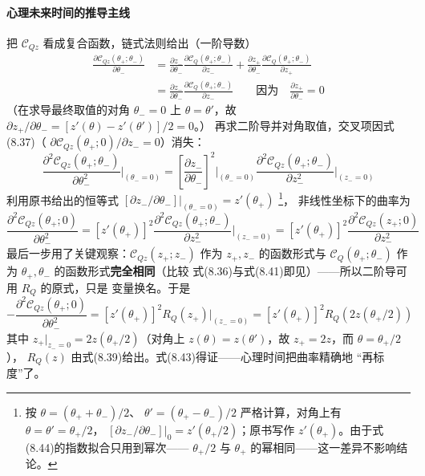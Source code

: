 \paragraph{心理未来时间的推导主线}
把 $\mathcal{C}_{Qz}$ 看成复合函数，链式法则给出（一阶导数）
\begin{align*}
\frac{\partial\mathcal{C}_{Qz}(\theta_{+};\theta_{-})}{\partial\theta_{-}}
&=\frac{\partial z_{-}}{\partial\theta_{-}}
\frac{\partial\mathcal{C}_{Q}(\theta_{+};\theta_{-})}{\partial z_{-}}
+\frac{\partial z_{+}}{\partial\theta_{-}}
\frac{\partial\mathcal{C}_{Q}(\theta_{+};\theta_{-})}{\partial z_{+}}\\
&=\frac{\partial z_{-}}{\partial\theta_{-}}
\frac{\partial\mathcal{C}_{Q}(\theta_{+};\theta_{-})}{\partial z_{-}}
\qquad\text{因为}\quad\frac{\partial z_{+}}{\partial\theta_{-}}=0
\tag{8.48}
\end{align*}
（在求导最终取值的对角 $\theta_{-}=0$ 上 $\theta=\theta'$，故
$\partial z_{+}/\partial\theta_{-}=[z'(\theta)-z'(\theta')]/2=0$。）
再求二阶导并对角取值，交叉项因式(8.37)（
$\partial\mathcal{C}_{Qz}(\theta_{+};0)/\partial z_{-}=0$）消失：
\begin{equation*}
\frac{\partial^{2}\mathcal{C}_{Qz}(\theta_{+};\theta_{-})}
{\partial\theta_{-}^{2}}\bigg|_{(\theta_{-}=0)}
=\left[\frac{\partial z_{-}}{\partial\theta_{-}}\right]^{2}
\bigg|_{(\theta_{-}=0)}
\frac{\partial^{2}\mathcal{C}_{Qz}(\theta_{+};\theta_{-})}
{\partial z_{-}^{2}}\bigg|_{(z_{-}=0)}
\end{equation*}
利用原书给出的恒等式
$[\partial z_{-}/\partial\theta_{-}]|_{(\theta_{-}=0)}=z'(\theta_{+})$
\footnote{按 $\theta=(\theta_{+}+\theta_{-})/2$、
$\theta'=(\theta_{+}-\theta_{-})/2$ 严格计算，对角上有
$\theta=\theta'=\theta_{+}/2$，
$[\partial z_{-}/\partial\theta_{-}]|_{0}=z'(\theta_{+}/2)$；原书写作
$z'(\theta_{+})$。由于式(8.44)的指数拟合只用到幂次——
$\theta_{+}/2$ 与 $\theta_{+}$ 的幂相同——这一差异不影响结论。}，
非线性坐标下的曲率为
\begin{equation*}
\frac{\partial^{2}\mathcal{C}_{Qz}(\theta_{+};0)}{\partial\theta_{-}^{2}}
=\left[z'(\theta_{+})\right]^{2}
\frac{\partial^{2}\mathcal{C}_{Qz}(\theta_{+};\theta_{-})}
{\partial z_{-}^{2}}\bigg|_{(z_{-}=0)}
=\left[z'(\theta_{+})\right]^{2}
\frac{\partial^{2}\mathcal{C}_{Qz}(z_{+};0)}{\partial z_{-}^{2}}
\end{equation*}
最后一步用了关键观察：$\mathcal{C}_{Qz}(z_{+};z_{-})$ 作为
$z_{+},z_{-}$ 的函数形式与 $\mathcal{C}_{Q}(\theta_{+};\theta_{-})$
作为 $\theta_{+},\theta_{-}$ 的函数形式\textbf{完全相同}（比较
式(8.36)与式(8.41)即见）——所以二阶导可用 $R_{Q}$ 的原式，只是
变量换名。于是
\begin{equation*}
-\frac{\partial^{2}\mathcal{C}_{Qz}(\theta_{+};0)}{\partial\theta_{-}^{2}}
=\left[z'(\theta_{+})\right]^{2}R_{Q}(z_{+})\big|_{(z_{-}=0)}
=\left[z'(\theta_{+})\right]^{2}
R_{Q}\!\left(2z(\theta_{+}/2)\right)
\tag{8.49}
\end{equation*}
其中 $z_{+}|_{z_{-}=0}=2z(\theta_{+}/2)$（对角上
$z(\theta)=z(\theta')$，故 $z_{+}=2z$，而 $\theta=\theta_{+}/2$），
$R_{Q}(z)$ 由式(8.39)给出。式(8.43)得证——心理时间把曲率精确地
“再标度”了。

